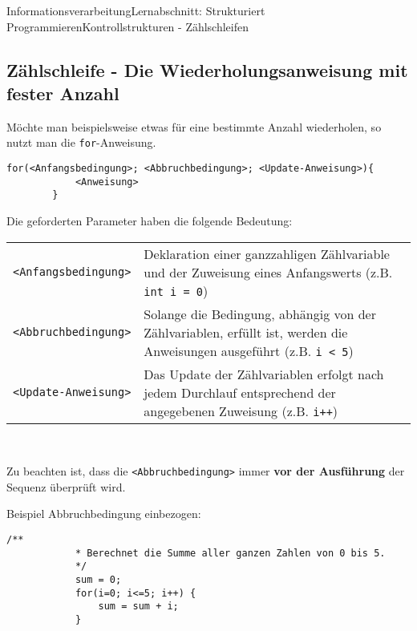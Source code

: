 \documentclass[11pt,oneside,openany,headings=optiontotoc,11pt,numbers=noenddot]{article}
\begin{document}
	\begin{worksheet}{Informationsverarbeitung}{Lernabschnitt: Strukturiert Programmieren}{Kontrollstrukturen - Zählschleifen}
		\setlength{\columnseprule}{0pt}
		\noindent
		\setcounter{section}{6}
		\setcounter{subsection}{4}
		\setcounter{page}{25}
		\vspace*{-35pt}
		\subsection{Zählschleife - Die Wiederholungsanweisung mit fester Anzahl}
		Möchte man beispielsweise etwas für eine bestimmte Anzahl wiederholen, so nutzt man die \lstinline[style=Python]|for|-Anweisung.
		\begin{lstlisting}[style=Python]
		for(<Anfangsbedingung>; <Abbruchbedingung>; <Update-Anweisung>){
			<Anweisung>
		}
		\end{lstlisting}
		\par\bigskip\noindent
		Die geforderten Parameter haben die folgende Bedeutung:\\
		\begin{tabularx}{\textwidth}{lX}
			{\lstinline[style=Python]|<Anfangsbedingung>|} & Deklaration einer ganzzahligen Zählvariable und der Zuweisung eines Anfangswerts (z.B. {\lstinline[style=Python]|int i = 0|})\\
			{\lstinline[style=Python]|<Abbruchbedingung>|} & Solange die Bedingung, abhängig von der Zählvariablen, erfüllt ist, werden die Anweisungen ausgeführt (z.B. {\lstinline[style=Python]|i < 5|})\\
			{\lstinline[style=Python]|<Update-Anweisung>|} & Das Update der Zählvariablen erfolgt nach jedem Durchlauf entsprechend der angegebenen Zuweisung (z.B. {\lstinline[style=Python]|i++|})
		\end{tabularx}\\
		\par\noindent
		Zu beachten ist, dass die {\lstinline[style=Python]|<Abbruchbedingung>|} immer \textbf{vor der Ausführung} der Sequenz überprüft wird.
		\par\noindent
		\begin{minipage}[t]{0.48\textwidth}
			\vspace*{0pt}
			Beispiel Abbruchbedingung einbezogen:
			\begin{lstlisting}[style=Python,frame=single]
			/**
			* Berechnet die Summe aller ganzen Zahlen von 0 bis 5.
			*/
			sum = 0;
			for(i=0; i<=5; i++) {
				sum = sum + i;
			}
			\end{lstlisting}

\end{minipage}
\end{worksheet}
\end{document}
